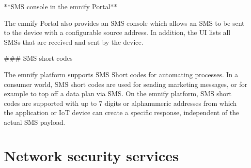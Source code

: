 \documentclass[11pt, oneside]{article}   	%
\begin{document}
\begin{markdown}

**SMS console in the emnify Portal** 

The emnify Portal also provides an SMS console which allows an SMS to be sent to the device with a configurable source address.
In addition, the UI lists all SMSs that are received and sent by the device.

### SMS short codes

The emnify platform supports SMS Short codes for automating processes.
In a consumer world, SMS short codes are used for sending marketing messages, or for example to top off a data plan via SMS.
On the emnify platform, SMS short codes are supported with up to 7 digits or alphanumeric addresses from which the application or IoT device can create a specific response, independent of the actual SMS payload.


\end{markdown}

\section{Network security services}
\end{document}
